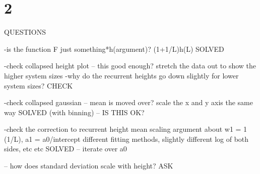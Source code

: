 \documentclass[12pt]{report}
\begin{document}

\section*{2}


QUESTIONS

-is the function F just something*h(argument)?
	(1+1/L)h(L)
	SOLVED 

-check collapsed height plot -- this good enough? 
	stretch the data out to show the higher system sizes 
	-why do the recurrent heights go down slightly for lower system sizes? 
	CHECK 

-check collapsed gaussian -- mean is moved over?
	scale the x and y axis the same way 
	SOLVED (with binning)
		-- IS THIS OK? 

-check the correction to recurrent height mean scaling 
	argument about w1 = 1 (1/L), a1 = a0/intercept 
	different fitting methods, slightly different 
		log of both sides, etc etc 
	SOLVED -- iterate over a0 

-- how does standard deviation scale with height? 
	ASK 













\end{document}
